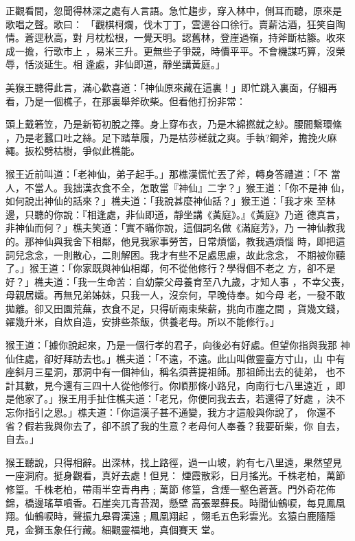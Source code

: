 \begin{pinyinscope}
{正觀看間，忽聞得林深之處有人言語。急忙趨步，穿入林中，側耳而聽，原來是
歌唱之聲。歌曰：
「觀棋柯爛，伐木丁丁，雲邊谷口徐行。賣薪沽酒，狂笑自陶情。蒼逕秋高，對
月枕松根，一覺天明。認舊林，登崖過嶺，持斧斷枯籐。收來成一擔，行歌市上
，易米三升。更無些子爭競，時價平平。不會機謀巧算，沒榮辱，恬淡延生。相
逢處，非仙即道，靜坐講黃庭。」

美猴王聽得此言，滿心歡喜道：「神仙原來藏在這裏！」即忙跳入裏面，仔細再
看，乃是一個樵子，在那裏舉斧砍柴。但看他打扮非常：

頭上戴箬笠，乃是新筍初脫之籜。身上穿布衣，乃是木綿撚就之紗。腰間繫環絛
，乃是老蠶口吐之絲。足下踏草履，乃是枯莎槎就之爽。手執?鋼斧，擔挽火麻
繩。扳松劈枯樹，爭似此樵能。

猴王近前叫道：「老神仙，弟子起手。」那樵漢慌忙丟了斧，轉身答禮道：「不
當人，不當人。我拙漢衣食不全，怎敢當『神仙』二字？」猴王道：「你不是神
仙，如何說出神仙的話來？」樵夫道：「我說甚麼神仙話？」猴王道：「我才來
至林邊，只聽的你說：『相逢處，非仙即道，靜坐講《黃庭》。』《黃庭》乃道
德真言，非神仙而何？」樵夫笑道：「實不瞞你說，這個詞名做《滿庭芳》，乃
一神仙教我的。那神仙與我舍下相鄰，他見我家事勞苦，日常煩惱，教我遇煩惱
時，即把這詞兒念念，一則散心，二則解困。我才有些不足處思慮，故此念念，
不期被你聽了。」猴王道：「你家既與神仙相鄰，何不從他修行？學得個不老之
方，卻不是好？」樵夫道：「我一生命苦：自幼蒙父母養育至八九歲，才知人事
，不幸父喪，母親居孀。再無兄弟姊妹，只我一人，沒奈何，早晚侍奉。如今母
老，一發不敢拋離。卻又田園荒蕪，衣食不足，只得斫兩束柴薪，挑向市廛之間
，貨幾文錢，糴幾升米，自炊自造，安排些茶飯，供養老母。所以不能修行。」

猴王道：「據你說起來，乃是一個行孝的君子，向後必有好處。但望你指與我那
神仙住處，卻好拜訪去也。」樵夫道：「不遠，不遠。此山叫做靈臺方寸山，山
中有座斜月三星洞，那洞中有一個神仙，稱名須菩提祖師。那祖師出去的徒弟，
也不計其數，見今還有三四十人從他修行。你順那條小路兒，向南行七八里遠近
，即是他家了。」猴王用手扯住樵夫道：「老兄，你便同我去去，若還得了好處
，決不忘你指引之恩。」樵夫道：「你這漢子甚不通變，我方才這般與你說了，
你還不省？假若我與你去了，卻不誤了我的生意？老母何人奉養？我要斫柴，你
自去，自去。」

猴王聽說，只得相辭。出深林，找上路徑，過一山坡，約有七八里遠，果然望見
一座洞府。挺身觀看，真好去處！但見：
煙霞散彩，日月搖光。千株老柏，萬節修篁。千株老柏，帶雨半空青冉冉﹔萬節
修篁，含煙一壑色蒼蒼。門外奇花佈錦，橋邊瑤草噴香。石崖突兀青苔潤，懸壁
高張翠蘚長。時聞仙鶴唳，每見鳳凰翔。仙鶴唳時，聲振九皋霄漢遠﹔鳳凰翔起
，翎毛五色彩雲光。玄猿白鹿隨隱見，金獅玉象任行藏。細觀靈福地，真個賽天
堂。

}
\end{pinyinscope}
